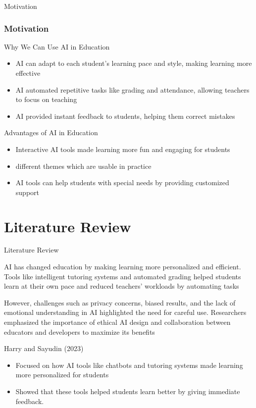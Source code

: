 \documentclass[serif, aspectratio=169]{beamer}
\begin{document}
\begin{frame}{ Motivation}
	\frametitle<presentation>{ Motivation}
	\begin{block}{Why We Can Use AI in Education }
		\begin{itemize}
			\item AI can adapt to each student’s learning pace and style, making learning more effective
			\item AI automated repetitive tasks like grading and attendance, allowing teachers to focus on teaching
			\item AI provided instant feedback to students, helping them correct mistakes 
        
		\end{itemize}
	\end{block}
	\begin{block}{Advantages of AI in Education}
		\begin{itemize}
			\item Interactive AI tools made learning more fun and engaging for students
			\item different themes which are usable in practice
			\item AI tools can help students with special needs by providing customized support \emph{}
		\end{itemize}
	\end{block}
\end{frame}

\section{Literature Review}
\begin{frame}{Literature Review}

AI has changed education by making learning more personalized and efficient. Tools like intelligent tutoring systems and automated grading helped students learn at their own pace and reduced teachers’ workloads by automating tasks

However, challenges such as privacy concerns, biased results, and the lack of emotional understanding in AI highlighted the need for careful use. Researchers emphasized the importance of ethical AI design and collaboration between educators and developers to maximize its benefits​


\end{frame}

\begin{frame}{Harry and Sayudin (2023)}

         \begin{itemize}
			\item Focused on how AI tools like chatbots and tutoring systems made learning more personalized for students
			\item Showed that these tools helped students learn better by giving immediate feedback.
        
	\end{itemize}

\end{frame}
\end{document}
